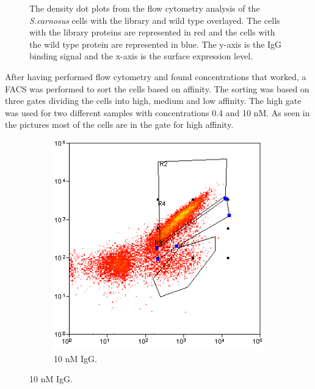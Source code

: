 \documentclass{article}
\begin{document}
\begin{multicols}{2}
\begin{figure}[H]
		\caption{The density dot plots from the flow cytometry analysis of the \textit{S.carnosus} cells with the library and wild type overlayed. The cells with the library proteins are represented in red and the cells with the wild type protein are represented in blue. The y-axis is the IgG binding signal and the x-axis is the surface expression level.}
		\label{overlap}
	\end{figure}

	After having performed flow cytometry and found concentrations that worked, a FACS was performed to sort the cells based on affinity. The sorting was based on three gates dividing the cells into high, medium and low affinity. The high gate was used for two different samples with concentrations 0.4 and 10 nM. As seen in the pictures most of the cells are in the gate for high affinity.
	
	\begin{figure}[H]
		\centering
		\label{gate}
		\begin{subfigure}{0.8\linewidth}
			\includegraphics[width=\linewidth]{images/gate_3.png}
			\caption{10 nM IgG.}
		\end{subfigure}
		

\end{figure}
\end{multicols}
\end{document}
